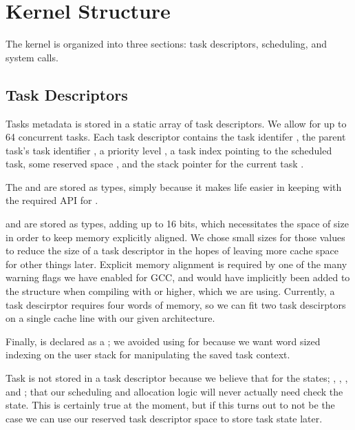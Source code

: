 \documentclass[pdftex,10pt,a4paper]{article}
\begin{document}
\newpage
\section*{Kernel Structure}

The kernel is organized into three sections: task descriptors,
scheduling, and system calls.

\subsection*{Task Descriptors}

Tasks metadata is stored in a static array of task descriptors. We
allow for up to 64 concurrent tasks. Each task descriptor contains the
task identifer , the parent task's task identifier
, a priority level , a task index pointing
to the  scheduled task, some reserved space ,
and the stack pointer for the current task .

The  and  are stored as  types, simply
because it makes life easier in keeping with the required API for
.

 and  are stored as  types,
adding up to 16 bits, which necessitates the  space of
size  in order to keep memory explicitly aligned. We
chose small sizes for those values to reduce the size of a task
descriptor in the hopes of leaving more cache space for other things
later. Explicit memory alignment is required by one of the many
warning flags we have enabled for GCC, and would have implicitly been
added to the structure when compiling with  or higher, which
we are using. Currently, a task descirptor requires four words of
memory, so we can fit two task descirptors on a single cache line with
our given architecture.

Finally,  is declared as a ; we avoided
using  for  because we want word sized indexing on
the user stack for manipulating the saved task context.

Task  is not stored in a task descriptor because we believe
that for the states; , , , and
; that our scheduling and allocation logic will never
actually need check the state. This is certainly true at the moment,
but if this turns out to not be the case we can use our reserved task
descriptor space to store task state later.
\end{document}
